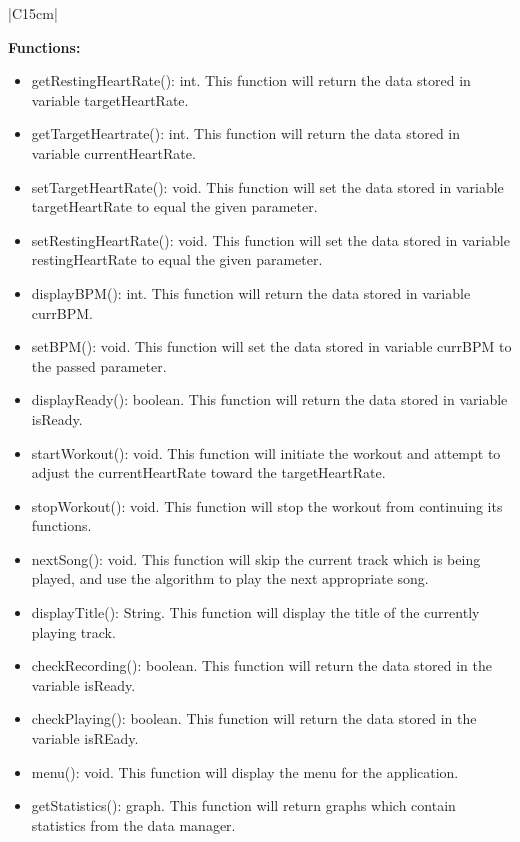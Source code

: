 \documentclass[letterpaper,english, 12pt]{scrreprt}
\begin{document}
\begin{center}
	\begin{tabular}{|C{15cm}|}
			\begin{flushleft}
				\textbf{Functions: } \\
			\end{flushleft}
				\begin{itemize}
					\item getRestingHeartRate(): int. This function will return the data stored in variable targetHeartRate.
					\item getTargetHeartrate(): int. This function will return the data stored in variable currentHeartRate.
					\item setTargetHeartRate(): void. This function will set the data stored in variable targetHeartRate to equal the given parameter.
					\item setRestingHeartRate(): void. This function will set the data stored in variable restingHeartRate to equal the given parameter.
					\item displayBPM(): int. This function will return the data stored in variable currBPM.
					\item setBPM(): void. This function will set the data stored in variable currBPM to the passed parameter.
					\item displayReady(): boolean. This function will return the data stored in variable isReady.
					\item startWorkout(): void. This function will initiate the workout and attempt to adjust the currentHeartRate toward the targetHeartRate.
					\item stopWorkout(): void. This function will stop the workout from continuing its functions.
					\item nextSong(): void. This function will skip the current track which is being played, and use the algorithm to play the next appropriate song.
					\item displayTitle(): String. This function will display the title of the currently playing track.
					\item checkRecording(): boolean. This function will return the data stored in the variable isReady.
					\item checkPlaying(): boolean. This function will return the data stored in the variable isREady.
					\item menu(): void. This function will display the menu for the application.
					\item getStatistics(): graph. This function will return graphs which contain statistics from the data manager.
				\end{itemize}
			\cr \hline
	\end{tabular}
\end{center}
\end{document}
